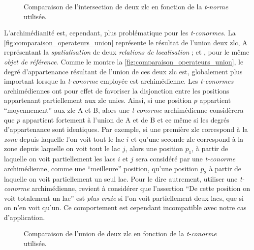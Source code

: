 \begin{figure}
  \centering
  
  \caption{Comparaison de l'intersection de deux \ac{zlc} en fonction
    de la \emph{t-norme} utilisée.}
  \label{fig:comparaison_operateurs_intersection}
\end{figure}

L'archimédianité est, cependant, plus problématique pour les
\emph{t-conormes.} La \autoref{fig:comparaison_operateurs_union}
représente le résultat de l'union deux \ac{zlc},
\textcolor{RdBu-9-1}{\textsf{A}} représentant la \emph{spatialisation}
de deux \emph{relations de localisation} ; 
et , pour le même \emph{objet de référence.}
Comme le montre la \autoref{fig:comparaison_operateurs_union}, le
degré d'appartenance résultant de l'union de ces deux \ac{zlc} est,
globalement plus important lorsque la \emph{t-conorme} employée est
archimédienne.
%
Les \emph{t-conormes} archimédiennes ont pour effet de favoriser la
disjonction entre les positions appartenant partiellement aux \ac{zlc}
unies. Ainsi, si une position \(p\) appartient \enquote{moyennement}
aux \ac{zlc} \textcolor{RdBu-9-1}{\textsf{A}} et
\textcolor{RdBu-9-9}{\textsf{B}}, alors une \emph{t-conorme}
archimédienne considèrera que \(p\) appartient fortement à l'union de
\textcolor{RdBu-9-1}{\textsf{A}} et de
\textcolor{RdBu-9-9}{\textsf{B}} et ce même si les degrés
d'appartenance sont identiques. Par exemple, si une première \ac{zlc}
correspond à la \emph{zone} depuis laquelle l'on voit tout le lac
\(i\) et qu'une seconde \ac{zlc} correspond à la zone depuis laquelle
on voit tout le lac \(j\), alors une position \(p_1\), à partir de
laquelle on voit partiellement les lacs \(i\) et \(j\) sera considéré
par une \emph{t-conorme} archimédienne, comme une \enquote{meilleure}
position, qu'une position \(p_2\) à partir de laquelle on voit
partiellement un seul lac. Pour le dire autrement, utiliser une
\emph{t-conorme} archimédienne, revient à considérer que l'assertion
\enquote{De cette position on voit totalement un lac} est \emph{plus
  vraie} si l'on voit partiellement deux lacs, que si on n'en voit
qu'un. Ce comportement est cependant incompatible avec notre cas
d'application.

\begin{figure}
  \centering
  
  \caption{Comparaison de l'union de deux \ac{zlc} en fonction de la
    \emph{t-conorme} utilisée.}
  \label{fig:comparaison_operateurs_union}
\end{figure}


